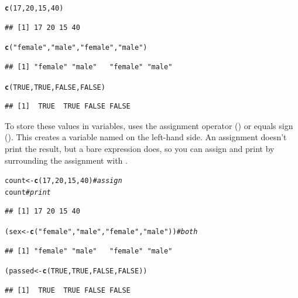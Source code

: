 \documentclass[11pt]{book}\usepackage[]{graphicx}\usepackage[]{color}
\makeatletter
\newcommand{\hlnum}[1]{\textcolor[rgb]{0.686,0.059,0.569}{#1}}%
\newcommand{\hlstr}[1]{\textcolor[rgb]{0.192,0.494,0.8}{#1}}%
\newcommand{\hlcom}[1]{\textcolor[rgb]{0.678,0.584,0.686}{\textit{#1}}}%
\newcommand{\hlstd}[1]{\textcolor[rgb]{0.345,0.345,0.345}{#1}}%
\newcommand{\hlkwb}[1]{\textcolor[rgb]{0.69,0.353,0.396}{#1}}%
\newcommand{\hlkwd}[1]{\textcolor[rgb]{0.737,0.353,0.396}{\textbf{#1}}}%
\newenvironment{kframe}{%
 \def\at@end@of@kframe{}%
 \ifinner\ifhmode%
  \def\at@end@of@kframe{\end{minipage}}%
  \begin{minipage}{\columnwidth}%
 \fi\fi%
 \def\FrameCommand##1{\hskip\@totalleftmargin \hskip-\fboxsep
 \colorbox{shadecolor}{##1}\hskip-\fboxsep
     \hskip-\linewidth \hskip-\@totalleftmargin \hskip\columnwidth}%
 \MakeFramed {\advance\hsize-\width
   \@totalleftmargin\z@ \linewidth\hsize
   \@setminipage}}%
 {\par\unskip\endMakeFramed%
 \at@end@of@kframe}
\newenvironment{knitrout}{}{} %
\renewenvironment{knitrout}{\small\renewcommand{\baselinestretch}{.85}}{} %
\makeatother
\begin{document}
\begin{knitrout}
\color{fgcolor}\begin{kframe}
\begin{alltt}
\hlkwd{c}\hlstd{(}\hlnum{17}\hlstd{,} \hlnum{20}\hlstd{,} \hlnum{15}\hlstd{,} \hlnum{40}\hlstd{)}
\end{alltt}
\begin{verbatim}
## [1] 17 20 15 40
\end{verbatim}
\begin{alltt}
\hlkwd{c}\hlstd{(}\hlstr{"female"}\hlstd{,} \hlstr{"male"}\hlstd{,} \hlstr{"female"}\hlstd{,} \hlstr{"male"}\hlstd{)}
\end{alltt}
\begin{verbatim}
## [1] "female" "male"   "female" "male"
\end{verbatim}
\begin{alltt}
\hlkwd{c}\hlstd{(}\hlnum{TRUE}\hlstd{,} \hlnum{TRUE}\hlstd{,} \hlnum{FALSE}\hlstd{,} \hlnum{FALSE}\hlstd{)}
\end{alltt}
\begin{verbatim}
## [1]  TRUE  TRUE FALSE FALSE
\end{verbatim}
\end{kframe}
\end{knitrout}


To store these values in variables, \R uses the assignment operator (\code{<-})
or equals sign (\code{=}). This creates a variable named on the left-hand side.
An assignment doesn't print the result, but a bare expression does, so you can
assign and print by surrounding the assignment with \code{()}.

\begin{knitrout}
\color{fgcolor}\begin{kframe}
\begin{alltt}
\hlstd{count} \hlkwb{<-} \hlkwd{c}\hlstd{(}\hlnum{17}\hlstd{,} \hlnum{20}\hlstd{,} \hlnum{15}\hlstd{,} \hlnum{40}\hlstd{)}                       \hlcom{# assign}
\hlstd{count}                                            \hlcom{# print}
\end{alltt}
\begin{verbatim}
## [1] 17 20 15 40
\end{verbatim}
\begin{alltt}
\hlstd{(sex} \hlkwb{<-} \hlkwd{c}\hlstd{(}\hlstr{"female"}\hlstd{,} \hlstr{"male"}\hlstd{,} \hlstr{"female"}\hlstd{,} \hlstr{"male"}\hlstd{))}   \hlcom{# both}
\end{alltt}
\begin{verbatim}
## [1] "female" "male"   "female" "male"
\end{verbatim}
\begin{alltt}
\hlstd{(passed} \hlkwb{<-} \hlkwd{c}\hlstd{(}\hlnum{TRUE}\hlstd{,} \hlnum{TRUE}\hlstd{,} \hlnum{FALSE}\hlstd{,} \hlnum{FALSE}\hlstd{))}
\end{alltt}
\begin{verbatim}
## [1]  TRUE  TRUE FALSE FALSE
\end{verbatim}
\end{kframe}
\end{knitrout}
\end{document}
